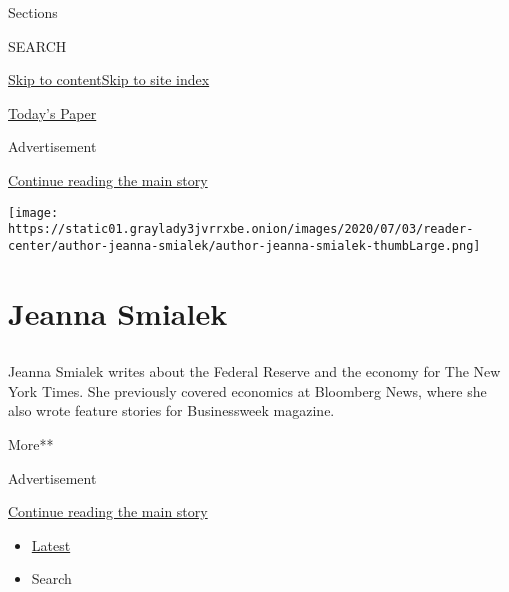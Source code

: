 Sections

SEARCH

\protect\hyperlink{site-content}{Skip to
content}\protect\hyperlink{site-index}{Skip to site index}

\href{https://myaccount.nytimes3xbfgragh.onion/auth/login?response_type=cookie\&client_id=vi}{}

\href{https://www.nytimes3xbfgragh.onion/section/todayspaper}{Today's
Paper}

Advertisement

\protect\hyperlink{after-top}{Continue reading the main story}

\texttt{[image: https://static01.graylady3jvrrxbe.onion/images/2020/07/03/reader-center/author-jeanna-smialek/author-jeanna-smialek-thumbLarge.png]}

\hypertarget{jeanna-smialek}{%
\section{Jeanna Smialek}\label{jeanna-smialek}}

\subsection{}

Jeanna Smialek writes about the Federal Reserve and the economy for The
New York Times. She previously covered economics at Bloomberg News,
where she also wrote feature stories for Businessweek magazine.~

More**

Advertisement

\protect\hyperlink{after-mid1}{Continue reading the main story}

\begin{itemize}
\tightlist
\item
  \protect\hyperlink{stream-panel}{Latest}
\item
  Search
\end{itemize}

